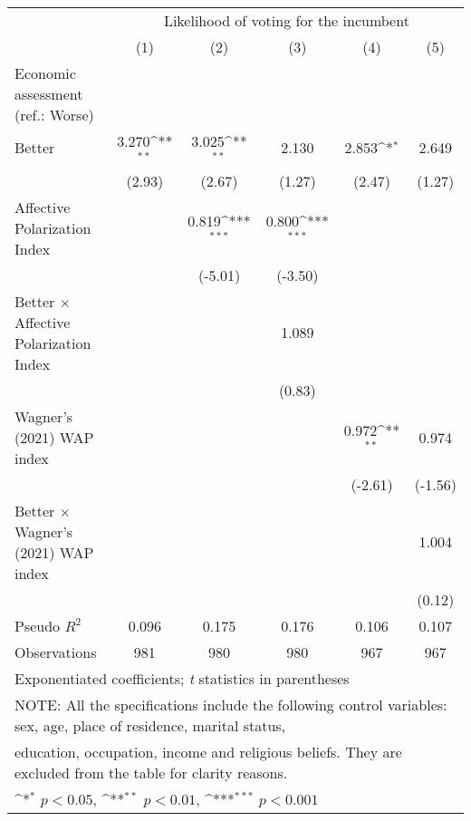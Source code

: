{
\def\sym#1{\ifmmode^{#1}\else\(^{#1}\)\fi}
\begin{tabular}{l*{5}{c}}
\toprule
                &\multicolumn{5}{c}{Likelihood of voting for the incumbent}                                    \\\cmidrule(lr){2-6}
                &\multicolumn{1}{c}{(1)}         &\multicolumn{1}{c}{(2)}         &\multicolumn{1}{c}{(3)}         &\multicolumn{1}{c}{(4)}         &\multicolumn{1}{c}{(5)}         \\
\midrule
Economic assessment (ref.: Worse)&                  &                  &                  &                  &                  \\
Better          &    3.270\sym{**} &    3.025\sym{**} &    2.130         &    2.853\sym{*}  &    2.649         \\
                &   (2.93)         &   (2.67)         &   (1.27)         &   (2.47)         &   (1.27)         \\
Affective Polarization Index&                  &    0.819\sym{***}&    0.800\sym{***}&                  &                  \\
                &                  &  (-5.01)         &  (-3.50)         &                  &                  \\
Better $\times$ Affective Polarization Index&                  &                  &    1.089         &                  &                  \\
                &                  &                  &   (0.83)         &                  &                  \\
Wagner's (2021) WAP index&                  &                  &                  &    0.972\sym{**} &    0.974         \\
                &                  &                  &                  &  (-2.61)         &  (-1.56)         \\
Better $\times$ Wagner's (2021) WAP index&                  &                  &                  &                  &    1.004         \\
                &                  &                  &                  &                  &   (0.12)         \\
\midrule
Pseudo \(R^{2}\)&    0.096         &    0.175         &    0.176         &    0.106         &    0.107         \\
Observations    &      981         &      980         &      980         &      967         &      967         \\
\bottomrule
\multicolumn{6}{l}{\footnotesize Exponentiated coefficients; \textit{t} statistics in parentheses}\\
\multicolumn{6}{l}{\footnotesize NOTE: All the specifications include the following control variables: sex, age, place of residence, marital status,}\\
\multicolumn{6}{l}{\footnotesize education, occupation, income and religious beliefs. They are excluded from the table for clarity reasons.}\\
\multicolumn{6}{l}{\footnotesize \sym{*} \(p<0.05\), \sym{**} \(p<0.01\), \sym{***} \(p<0.001\)}\\
\end{tabular}
}
